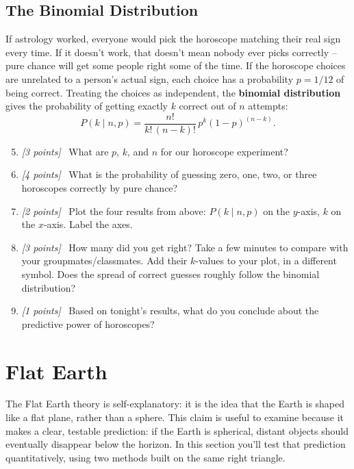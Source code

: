 \documentclass[11pt]{article}
\newcommand{\pts}[1]{\textit{[#1 points]}\ }
\begin{document}
\subsection{The Binomial Distribution}
If astrology worked, everyone would pick the horoscope matching their real
sign every time. If it doesn't work, that doesn't mean nobody ever picks
correctly -- pure chance will get some people right some of the time. If
the horoscope choices are unrelated to a person's actual sign, each choice
has a probability $p = 1/12$ of being correct. Treating the choices as
independent, the \textbf{binomial distribution} gives the probability of
getting exactly $k$ correct out of $n$ attempts:
\begin{equation}
    P(k \mid n, p) = \frac{n!}{k!\,(n-k)!}\, p^k (1-p)^{(n-k)}.
\end{equation}
\begin{enumerate}
    \setcounter{enumi}{4}
    \item \pts{3} What are $p$, $k$, and $n$ for our horoscope experiment?
    \item 
    \pts{4} What is the probability of guessing zero, one, two, or three
        horoscopes correctly by pure chance?
        \item \pts{2} Plot the four results from above: $P(k \mid n, p)$ on the $y$-axis, $k$ on the $x$-axis. Label the axes.

        \item \pts{3} How many did you get right? Take a few minutes to compare with your groupmates/classmates. Add their $k$-values to your plot, in a different symbol. Does the spread of correct guesses roughly follow
        the binomial distribution? 
        
        \item \pts{1} Based on tonight's results, what do you conclude about the
        predictive power of horoscopes? 

\end{enumerate}


\section{Flat Earth}
The Flat Earth theory is self-explanatory: it is the idea that the Earth is shaped like a flat plane, rather than a sphere. This claim is useful to examine because it makes a clear,
testable prediction: if the Earth is spherical, distant objects should
eventually disappear below the horizon. In this section you'll test that
prediction quantitatively, using two methods built on the same right
triangle.
\end{document}
